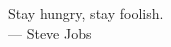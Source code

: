 \cleardoublepage
\thispagestyle{empty}

\vspace*{3cm}

\begin{raggedleft}
    Stay hungry, stay foolish.\\
    --- Steve Jobs\\
\end{raggedleft}

\vspace{4cm}

\begin{center}

\end{center}
